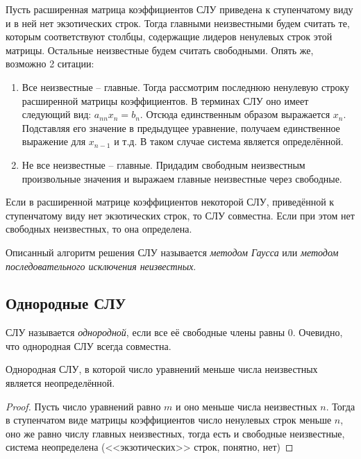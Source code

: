   Пусть расширенная матрица коэффициентов СЛУ приведена к ступенчатому виду и в ней нет экзотических строк. Тогда главными неизвестными будем считать те, которым соответствуют столбцы, содержащие лидеров ненулевых строк этой матрицы. Остальные неизвестные будем считать свободными. Опять же, возможно 2 ситации:
  \begin{enumerate}
    \item Все неизвестные -- главные. Тогда рассмотрим последнюю ненулевую строку расширенной матрицы коэффициентов. В терминах СЛУ оно имеет следующий вид: $a_{nn}x_n = b_n$. Отсюда единственным образом выражается $x_n$. Подставляя его значение в предыдущее уравнение, получаем единственное выражение для $x_{n-1}$ и т.д. В таком случае система является определённой.
    \item Не все неизвестные -- главные. Придадим свободным неизвестным произвольные значения и выражаем главные неизвестные через свободные.
  \end{enumerate}
  
  \begin{stm}
    Если в расширенной матрице коэффициентов некоторой СЛУ, приведённой к ступенчатому виду нет экзотических строк, то СЛУ совместна. Если  при этом нет свободных неизвестных, то она определена.
  \end{stm}
  
  Описанный алгоритм решения СЛУ называется \emph{методом Гаусса} или \emph{методом последовательного исключения неизвестных}.
  
  \subsection{Однородные СЛУ}
  \label{oslu}
  
  \begin{df}
    СЛУ называется \emph{однородной}, если все её свободные члены равны 0. Очевидно, что однородная СЛУ всегда совместна.
  \end{df}
  
  \begin{theorem}
    Однородная СЛУ, в которой число уравнений меньше числа неизвестных является неопределённой.
  \end{theorem}
  \begin{proof}
    Пусть число уравнений равно $m$ и оно меньше числа неизвестных $n$. Тогда в ступенчатом виде матрицы коэффициентов число ненулевых строк меньше $n$, оно же равно числу главных неизвестных, тогда есть и свободные неизвестные, система неопределена (<<экзотических>> строк, понятно, нет)
  \end{proof}
  
